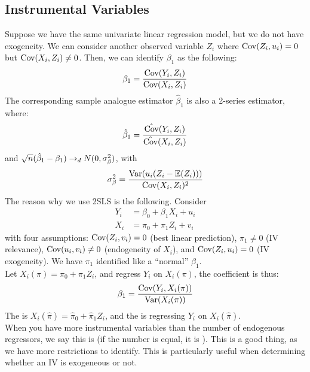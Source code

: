 \subsection{Instrumental Variables}
Suppose we have the same univariate linear regression model, but we do not have exogeneity. We can consider another observed variable $Z_i$ where $\text{Cov}(Z_i, u_i) = 0$ but $\text{Cov}(X_i, Z_i) \ne 0$. Then, we can identify $\beta_1$ as the following:
$$\beta_1 = \frac{\text{Cov}(Y_i, Z_i)}{\text{Cov}(X_i, Z_i)}$$
The corresponding sample analogue estimator $\hat{\beta}_1$ is also a 2-series estimator, where:
$$\hat{\beta}_1 = \frac{\hat{\text{Cov}}(Y_i, Z_i)}{\hat{\text{Cov}}(X_i, Z_i)}$$
and $\sqrt{n}(\hat{\beta}_1 - \beta_1) \to_d N(0, \sigma_\beta^2)$, with
$$\sigma_\beta^2 = \frac{\text{Var}(u_i(Z_i - \mathbb{E}(Z_i)))}{\text{Cov}(X_i, Z_i)^2}$$
The reason why we use 2SLS is the following. Consider
\begin{align*}
    Y_i &= \beta_0 + \beta_1 X_i + u_i \\
    X_i &= \pi_0 + \pi_1 Z_i + v_i
\end{align*}
with four assumptions: $\text{Cov}(Z_i, v_i) = 0$ (best linear prediction), $\pi_1 \ne 0$ (IV relevance), $\text{Cov}(u_i, v_i) \ne 0$ (endogeneity of $X_i$), and $\text{Cov}(Z_i, u_i) = 0$ (IV exogeneity). We have $\pi_1$ identified like a ``normal'' $\beta_1$. \\
Let $X_i(\pi) = \pi_0 + \pi_1 Z_i$, and regress $Y_i$ on $X_i(\pi)$, the coefficient is thus:
$$\beta_1 = \frac{\text{Cov}(Y_i, X_i(\pi))}{\text{Var}(X_i(\pi))}$$
The  is $X_i(\hat{\pi}) = \hat{\pi}_0 + \hat{\pi}_1Z_i$, and the  is regressing $Y_i$ on $X_i(\hat{\pi})$. \\
When you have more instrumental variables than the number of endogenous regressors, we say this is  (if the number is equal, it is ). This is a good thing, as we have more restrictions to identify. This is particularly useful when determining whether an IV is exogeneous or not.

